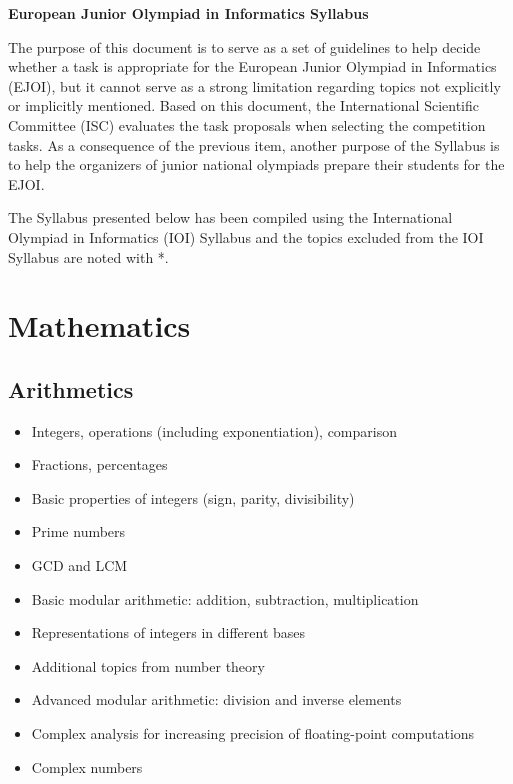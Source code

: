 \documentclass[12pt]{article}
\begin{document}
	\begin{center}
		\Large\textbf{European Junior Olympiad in Informatics Syllabus}
	\end{center}
	
	The purpose of this document is to serve as a set of guidelines to help decide whether a task is appropriate for the European Junior Olympiad in Informatics (EJOI), but it cannot serve as a strong limitation regarding topics not explicitly or implicitly mentioned. Based on this document, the International Scientific Committee (ISC) evaluates the task proposals when selecting the competition tasks. As a consequence of the previous item, another purpose of the Syllabus is to help the organizers of junior national olympiads prepare their students for the EJOI.
	
	The Syllabus presented below has been compiled using the International Olympiad in Informatics (IOI) Syllabus and the topics excluded from the IOI Syllabus are noted with *.
	
	\section{Mathematics}
	\subsection{Arithmetics}
		\begin{itemize}[label=]
			\item Integers, operations (including exponentiation), comparison
			\item Fractions, percentages
			\item Basic properties of integers (sign, parity, divisibility)
			\item Prime numbers
			\item GCD and LCM
			\item Basic modular arithmetic: addition, subtraction, multiplication
			\item Representations of integers in different bases
		\end{itemize}
		
		\begin{itemize}[label=]
			\item Additional topics from number theory
			\item Advanced modular arithmetic: division and inverse elements
			\item Complex analysis for increasing precision of floating-point computations
			\item Complex numbers
		\end{itemize}
	
\end{document}
